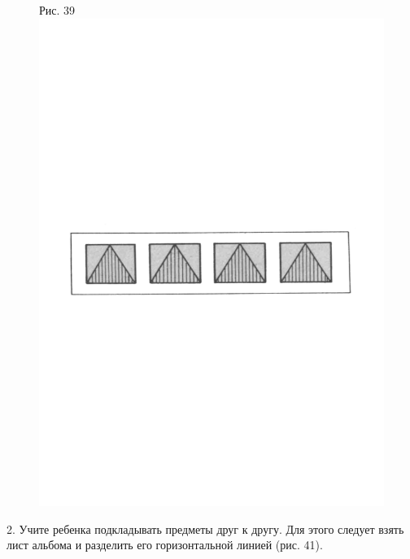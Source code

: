 \documentclass[a5paper]{book}
\begin{document}
\begin{figure}
\centering
Рис. 39\includegraphics[width=\linewidth]{media/media/image36.png}
\end{figure}

2. Учите ребенка подкладывать предметы друг к другу. Для этого следует
взять лист альбома и разделить его горизонтальной линией (рис. 41).
\end{document}
